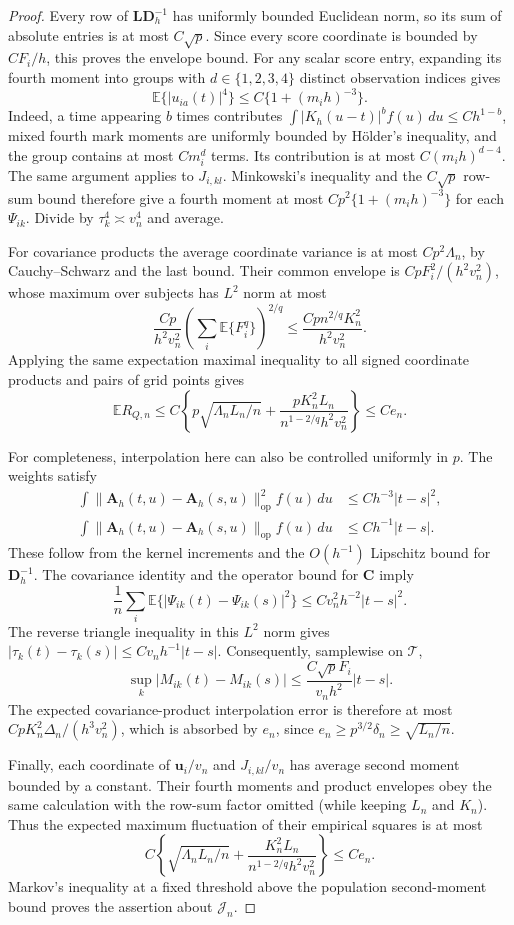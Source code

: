 \documentclass[12pt]{article}
\newcommand{\bu}{{\mathbf u}}
\newcommand{\bA}{{\mathbf A}}
\newcommand{\bC}{{\mathbf C}}
\newcommand{\bD}{{\mathbf D}}
\newcommand{\bL}{{\mathbf L}}
\newcommand{\expect}{\mathbb{E}}
\numberwithin{equation}{section}
\begin{document}
\begin{proof}
Every row of $\bL\bD_h^{-1}$ has uniformly bounded Euclidean norm,
so its sum of absolute entries is at most $C\sqrt p$.
Since every score coordinate is bounded by $CF_i/h$, this proves
the envelope bound.
For any scalar score entry, expanding its fourth moment into groups
with $d\in\{1,2,3,4\}$ distinct observation indices gives
\[
\expect\{|u_{ia}(t)|^4\}\le C\{1+(m_i h)^{-3}\}.
\]
Indeed, a time appearing $b$ times contributes
$\int|K_h(u-t)|^b f(u)\,du\le Ch^{1-b}$, mixed fourth mark
moments are uniformly bounded by H\"older's inequality, and the
group contains at most $Cm_i^d$ terms.  Its contribution is at most
$C(m_i h)^{d-4}$.  The same argument applies to $J_{i,kl}$.
Minkowski's inequality and the $C\sqrt p$ row-sum bound therefore
give a fourth moment at most $Cp^2\{1+(m_i h)^{-3}\}$ for each
$\Psi_{ik}$.  Divide by $\tau_k^4\asymp v_n^4$ and average.

For covariance products the average coordinate variance is at most
$Cp^2\Lambda_n$, by Cauchy--Schwarz and the last bound. Their
common envelope is $CpF_i^2/(h^2v_n^2)$, whose maximum over subjects
has $L^2$ norm at most
\[
\frac{Cp}{h^2v_n^2}
\left(\sum_i\expect\{F_i^q\}\right)^{2/q}
\le\frac{Cp n^{2/q}K_n^2}{h^2v_n^2}.
\]
Applying the same expectation maximal inequality to all signed
coordinate products and pairs of grid points gives
\[
\expect R_{Q,n}\le C\left\{p\sqrt{\Lambda_nL_n/n}
+\frac{pK_n^2L_n}{n^{1-2/q}h^2v_n^2}\right\}\le Ce_n.
\]

For completeness, interpolation here can also be controlled
uniformly in $p$.  The weights satisfy
\begin{align*}
\int\|\bA_h(t,u)-\bA_h(s,u)\|_{\mathrm{op}}^2 f(u)\,du
&\le Ch^{-3}|t-s|^2,\\
\int\|\bA_h(t,u)-\bA_h(s,u)\|_{\mathrm{op}}f(u)\,du
&\le Ch^{-1}|t-s|.
\end{align*}
These follow from the kernel increments and the $O(h^{-1})$
Lipschitz bound for $\bD_h^{-1}$.  The covariance identity and the
operator bound for $\bC$ imply
\[
\frac1n\sum_i\expect\{|\Psi_{ik}(t)-\Psi_{ik}(s)|^2\}
\le Cv_n^2h^{-2}|t-s|^2.
\]
The reverse triangle inequality in this $L^2$ norm gives
$|\tau_k(t)-\tau_k(s)|\le Cv_nh^{-1}|t-s|$.
Consequently, samplewise on $\mathcal T$,
\[
\sup_k|M_{ik}(t)-M_{ik}(s)|
\le\frac{C\sqrt p F_i}{v_nh^2}|t-s|.
\]
The expected covariance-product interpolation error is therefore
at most $CpK_n^2\Delta_n/(h^3v_n^2)$, which is absorbed by $e_n$,
since $e_n\ge p^{3/2}\delta_n\ge\sqrt{L_n/n}$.

Finally, each coordinate of $\bu_i/v_n$ and $J_{i,kl}/v_n$ has
average second moment bounded by a constant.  Their fourth moments
and product envelopes obey the same calculation with the row-sum
factor omitted (while keeping $L_n$ and $K_n$). Thus the expected
maximum fluctuation of their empirical squares is at most
\[
C\left\{\sqrt{\Lambda_nL_n/n}
+\frac{K_n^2L_n}{n^{1-2/q}h^2v_n^2}\right\}\le Ce_n.
\]
Markov's inequality at a fixed threshold above the population
second-moment bound proves the assertion about $\mathcal J_n$.
\end{proof}
\end{document}
